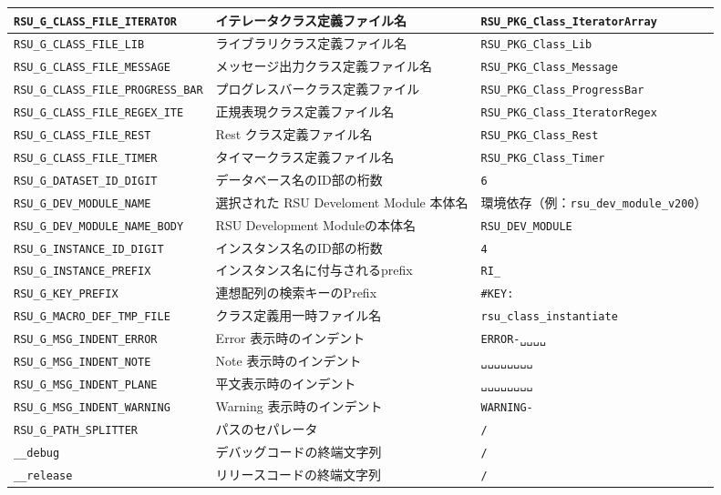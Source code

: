 \begin{center}
{\begin{xltabular}{\textwidth}{|p{5truecm}|X|p{5truecm}|}
\hline
\texttt{RSU\_G\_CLASS\_FILE\_ITERATOR}&イテレータクラス定義ファイル名&\texttt{RSU\_PKG\_Class\_IteratorArray}\\
\hline
\texttt{RSU\_G\_CLASS\_FILE\_LIB}&ライブラリクラス定義ファイル名&\texttt{RSU\_PKG\_Class\_Lib}\\
\hline
\texttt{RSU\_G\_CLASS\_FILE\_MESSAGE}&メッセージ出力クラス定義ファイル名&\texttt{RSU\_PKG\_Class\_Message}\\
\hline
\texttt{RSU\_G\_CLASS\_FILE\_PROGRESS\_BAR}&プログレスバークラス定義ファイル&\texttt{RSU\_PKG\_Class\_ProgressBar}\\
\hline
\texttt{RSU\_G\_CLASS\_FILE\_REGEX\_ITE}&正規表現クラス定義ファイル名&\texttt{RSU\_PKG\_Class\_IteratorRegex}\\
\hline
\texttt{RSU\_G\_CLASS\_FILE\_REST}&Rest クラス定義ファイル名&\texttt{RSU\_PKG\_Class\_Rest}\\
\hline
\texttt{RSU\_G\_CLASS\_FILE\_TIMER}&タイマークラス定義ファイル名&\texttt{RSU\_PKG\_Class\_Timer}\\
\hline
\texttt{RSU\_G\_DATASET\_ID\_DIGIT}&データベース名のID部の桁数&\texttt{6}\\
\hline
\texttt{RSU\_G\_DEV\_MODULE\_NAME}&選択された RSU Develoment Module 本体名&環境依存（例：\texttt{rsu\_dev\_module\_v200}）\\
\hline
\texttt{RSU\_G\_DEV\_MODULE\_NAME\_BODY}&RSU Development Moduleの本体名&\texttt{RSU\_DEV\_MODULE}\\
\hline
\texttt{RSU\_G\_INSTANCE\_ID\_DIGIT}&インスタンス名のID部の桁数&\texttt{4}\\
\hline
\texttt{RSU\_G\_INSTANCE\_PREFIX}&インスタンス名に付与されるprefix&\texttt{RI\_}\\
\hline
\texttt{RSU\_G\_KEY\_PREFIX}&連想配列の検索キーのPrefix&\texttt{\#KEY:}\\
\hline
\texttt{RSU\_G\_MACRO\_DEF\_TMP\_FILE}&クラス定義用一時ファイル名&\texttt{rsu\_class\_instantiate}\\
\hline
\texttt{RSU\_G\_MSG\_INDENT\_ERROR}&Error 表示時のインデント&\texttt{ERROR-␣␣␣␣}\\
\hline
\texttt{RSU\_G\_MSG\_INDENT\_NOTE}&Note 表示時のインデント&\texttt{␣␣␣␣␣␣␣␣}\\
\hline
\texttt{RSU\_G\_MSG\_INDENT\_PLANE}&平文表示時のインデント&\texttt{␣␣␣␣␣␣␣␣}\\
\hline
\texttt{RSU\_G\_MSG\_INDENT\_WARNING}&Warning 表示時のインデント&\texttt{WARNING-}\\
\hline
\texttt{RSU\_G\_PATH\_SPLITTER}&パスのセパレータ&\texttt{/}\\
\hline
\texttt{\_\_debug}&デバッグコードの終端文字列&\texttt{/}\\
\hline
\texttt{\_\_release}&リリースコードの終端文字列&\texttt{/}\\
\hline
\end{xltabular}
}
\end{center}
 
